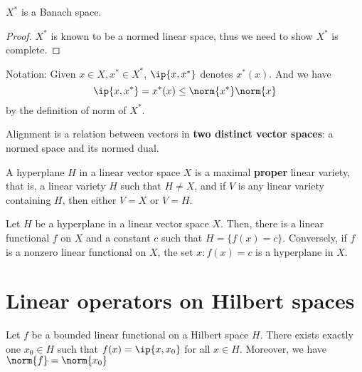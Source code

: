 \begin{refsection}
\begin{theorem}
\cite[107]{luenberger1969optimization}$X^*$ is a Banach space.
\end{theorem}
\begin{proof}
 $X^*$ is known to be a normed linear space, thus we need to show $X^*$ is complete. 	
\end{proof}


\begin{mdframed}
Notation: Given $x\in X,x^* \in X^*$, $\ip{x,x^*}$ denotes $x^*(x)$. And we have
$$\ip{x,x^*} = x^*(x) \leq \norm{x^*}\norm{x}$$
by the definition of norm of $X^*$.
\end{mdframed}


\begin{remark}
Alignment is a relation between vectors in \textbf{two distinct vector spaces}: a normed space and its normed dual.
\end{remark}


\begin{definition}
\cite[129]{luenberger1969optimization}A hyperplane $H$ in a linear vector space $X$ is a maximal \textbf{proper} linear variety, that is, a linear variety $H$ such that $H\neq X$, and if $V$ is any linear variety containing $H$, then either $V=X$ or $V=H$.
\end{definition}

\begin{theorem}
\cite[129]{luenberger1969optimization}Let $H$ be a hyperplane in a linear vector space $X$. Then, there is a linear functional $f$ on $X$ and a constant $c$ such that $H = \{f(x) = c\}$. Conversely, if $f$ is a nonzero linear functional on $X$, the set $x:f(x) = c$ is a hyperplane in $X$.
\end{theorem}



\section{Linear operators on Hilbert spaces}\label{ch:functional-analysis:sec:linear-operators-on-hilbert-spaces}
\begin{theorem}
\cite[126]{debnath2005hilbert} Let $f$ be a bounded linear functional on a Hilbert space $H$. There exists exactly one $x_0 \in H$ such that $f(x) = \ip{x,x_0}$ for all $x \in H$. Moreover, we have $\norm{f} = \norm{x_0}$
\end{theorem}





\end{refsection}
